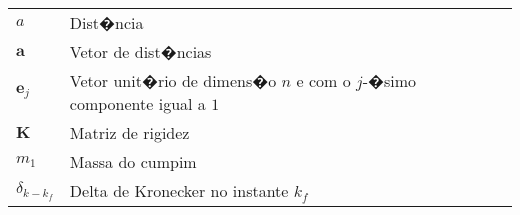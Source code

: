 \begin{longtable}{ll}
$a$ & Dist�ncia\\
$\textbf{a}$ & Vetor de dist�ncias\\
$\textbf{e}_{j}$ & Vetor unit�rio de dimens�o $n$ e com o $j$-�simo componente igual a $1$ \\
$\textbf{K}$ & Matriz de rigidez\\
$m_1$ & Massa do cumpim\\
$\delta_{k-k_f}$ & Delta de Kronecker no instante $k_f$\\

\end{longtable}

